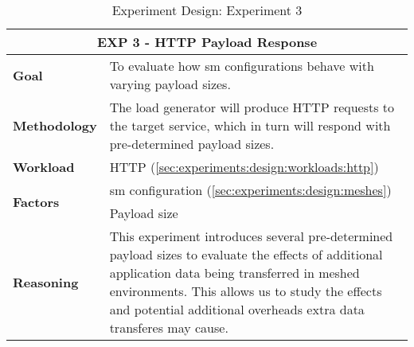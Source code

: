 \begin{table}[!t]
    \centering

    \begin{tabularx}{\textwidth}{l X}
    
        \toprule
        \multicolumn{2}{c}{\textbf{EXP 3 - HTTP Payload Response}}  \\
        \toprule
        
        \textbf{Goal}
        & To evaluate how \gls{sm} configurations behave with varying payload sizes. \\
        \midrule
        
        \textbf{Methodology}
        & The load generator will produce HTTP requests to the target service, which in turn will respond with pre-determined payload sizes.  \\
        \midrule
        
        \textbf{Workload} 
        & HTTP (\cref{sec:experiments:design:workloads:http}) \\
        \midrule

        \multirow{2}{*}{\textbf{Factors}} 
        & \Gls{sm} configuration (\cref{sec:experiments:design:meshes}) \\
        & Payload size \\
        \midrule
        
        \textbf{Reasoning}
        & This experiment introduces several pre-determined payload sizes to evaluate the effects of additional application data being transferred in meshed environments. This allows us to study the effects and potential additional overheads extra data transferes may cause. \\

        \bottomrule

    \end{tabularx}
    \caption[Experiment Design: Experiment 3]{Experiment Design: Experiment 3}
    \label{tab:experiment:design:03}
\end{table}
